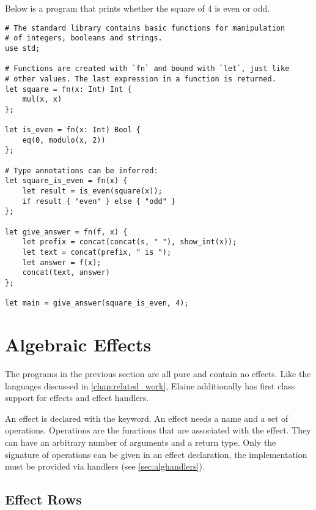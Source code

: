 Below is a program that prints whether the square of 4 is even or odd. 

\begin{lstlisting}[language=elaine, style=fancy]
# The standard library contains basic functions for manipulation
# of integers, booleans and strings.
use std;

# Functions are created with `fn` and bound with `let`, just like
# other values. The last expression in a function is returned.
let square = fn(x: Int) Int {
    mul(x, x)
};

let is_even = fn(x: Int) Bool {
    eq(0, modulo(x, 2))
};

# Type annotations can be inferred:
let square_is_even = fn(x) {
    let result = is_even(square(x));
    if result { "even" } else { "odd" }
};

let give_answer = fn(f, x) {
	let prefix = concat(concat(s, " "), show_int(x));
    let text = concat(prefix, " is ");
    let answer = f(x);
    concat(text, answer)
};

let main = give_answer(square_is_even, 4);
\end{lstlisting}

\section{Algebraic Effects}

The programs in the previous section are all pure and contain no effects. Like the languages discussed in \cref{chap:related_work}, Elaine additionally has first class support for effects and effect handlers.

An effect is declared with the  keyword. An effect needs a name and a set of operations. Operations are the functions that are associated with the effect. They can have an arbitrary number of arguments and a return type. Only the signature of operations can be given in an effect declaration, the implementation must be provided via handlers (see \cref{sec:alghandlers}).

\subsection{Effect Rows}


